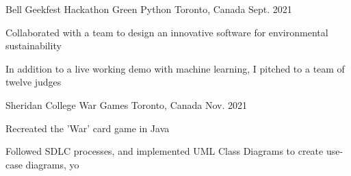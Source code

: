 \begin{cventries}
  \cventry
    {Bell Geekfest Hackathon}
    {Green Python}
    {Toronto, Canada}
    {Sept. 2021}
    {
      \begin{cvitems}
        \item {Collaborated with a team to design an innovative software for environmental sustainability
        \item In addition to a live working demo with machine learning, I pitched to a team of twelve judges}
      \end{cvitems}
    }
  \cventry
    {Sheridan College}
    {War Games}
    {Toronto, Canada}
    {Nov. 2021}
    {
      \begin{cvitems}
        \item {Recreated the 'War' card game in Java 
        \item Followed SDLC processes, and implemented UML Class Diagrams to create use-case diagrams, yo}
      \end{cvitems}
    }
\end{cventries}
